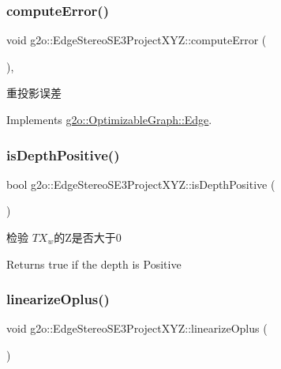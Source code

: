 \subsubsection{\texorpdfstring{compute\+Error()}{computeError()}}
{\footnotesize\ttfamily void g2o\+::\+Edge\+Stereo\+S\+E3\+Project\+X\+Y\+Z\+::compute\+Error (\begin{DoxyParamCaption}{ }\end{DoxyParamCaption})\hspace{0.3cm}{\ttfamily [inline]}, {\ttfamily [virtual]}}

重投影误差 

Implements \mbox{\hyperlink{classg2o_1_1_optimizable_graph_1_1_edge_a1e6d9f4128866982de5e11e03edd7775}{g2o\+::\+Optimizable\+Graph\+::\+Edge}}.

\mbox{\label{classg2o_1_1_edge_stereo_s_e3_project_x_y_z_ac176aff8aa08a73f52d7a0f5c3080d4d}} 
\subsubsection{\texorpdfstring{is\+Depth\+Positive()}{isDepthPositive()}}
{\footnotesize\ttfamily bool g2o\+::\+Edge\+Stereo\+S\+E3\+Project\+X\+Y\+Z\+::is\+Depth\+Positive (\begin{DoxyParamCaption}{ }\end{DoxyParamCaption})\hspace{0.3cm}{\ttfamily [inline]}}

检验 $ TX_w $的\+Z是否大于0 \begin{DoxyReturn}{Returns}
true if the depth is Positive 
\end{DoxyReturn}
\mbox{\label{classg2o_1_1_edge_stereo_s_e3_project_x_y_z_aea04d86a304c6cb4e2a3f34b35166f30}} 
\subsubsection{\texorpdfstring{linearize\+Oplus()}{linearizeOplus()}}
{\footnotesize\ttfamily void g2o\+::\+Edge\+Stereo\+S\+E3\+Project\+X\+Y\+Z\+::linearize\+Oplus (\begin{DoxyParamCaption}{ }\end{DoxyParamCaption})\hspace{0.3cm}{\ttfamily [virtual]}}

